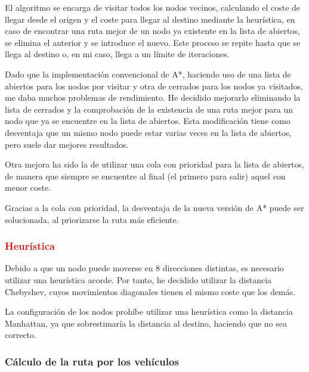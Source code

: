 \bigskip

El algoritmo se encarga de visitar todos los nodos vecinos, calculando el coste de llegar desde el origen y el coste para llegar al destino mediante la heurística, en caso de encontrar una ruta mejor de un nodo ya existente en la lista de abiertos, se elimina el anterior y se introduce el nuevo. Este proceso se repite hasta que se llega al destino o, en mi caso, llega a un límite de iteraciones.

\bigskip

Dado que la implementación convencional de A*, haciendo uso de una lista de abiertos para los nodos por visitar y otra de cerrados para los nodos ya visitados, me daba muchos problemas de rendimiento. He decidido mejorarlo eliminando la lista de cerrados y la comprobación de la existencia de una ruta mejor para un nodo que ya se encuentre en la lista de abiertos\cite{a-star}. Esta modificación tiene como desventaja que un mismo nodo puede estar varias veces en la lista de abiertos, pero suele dar mejores resultados\cite{Chen2007PriorityQA}.

\bigskip

Otra mejora ha sido la de utilizar una cola con prioridad para la lista de abiertos, de manera que siempre se encuentre al final (el primero para salir) aquel con menor coste.

\bigskip

Gracias a la cola con prioridad, la desventaja de la nueva versión de A* puede ser solucionada, al priorizarse la ruta más eficiente.


\subsubsection{\textcolor{red}{Heurística}}

Debido a que un nodo puede moverse en 8 direcciones distintas, es necesario utilizar una heurística acorde. Por tanto, he decidido utilizar la distancia Chebyshev\cite{enwiki:1149051498}, cuyos movimientos diagonales tienen el mismo coste que los demás. 

\bigskip

La configuración de los nodos prohíbe utilizar una heurística como la distancia Manhattan, ya que sobrestimaría la distancia al destino, haciendo que no sea correcto.

\subsubsection{Cálculo de la ruta por los vehículos}

